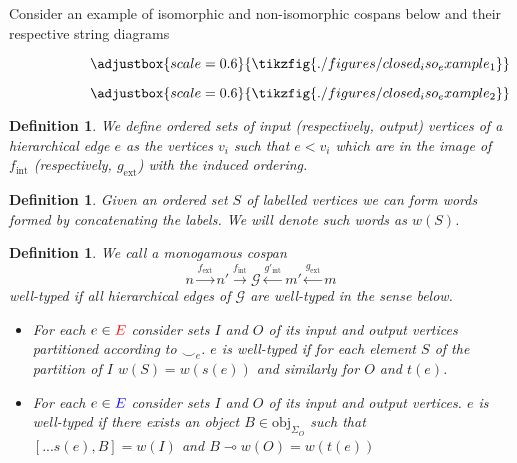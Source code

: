 \documentclass[peerreviewcls]{IEEEtran}
\newtheorem{definition}[theorem]{Definition}
\newcommand{\consistency}{{\smile}}
\begin{document}
Consider an example of isomorphic and non-isomorphic cospans below and their respective string diagrams

\begin{figure}
  \begin{subfigure}[c]{0.4\linewidth}
    \[
    \adjustbox{scale=0.6}{
    \tikzfig{./figures/closed_iso_example_1}
    }
    \]
  \end{subfigure}
  \hfill
  \begin{subfigure}[c]{0.4\linewidth}
    \[
    \adjustbox{scale=0.6}{
    \tikzfig{./figures/closed_iso_example_2}
    }
    \]
  \end{subfigure}
\end{figure}

\begin{definition}

We define ordered sets of \textit{input} (respectively, \textit{output}) vertices of a hierarchical edge $e$ as the vertices $v_{i}$ such that $e < v_{i}$ which are in the image of $f_{\text{int}}$ (respectively, $g_{\text{ext}}$) with the induced ordering.
\end{definition}

\begin{definition}

Given an ordered set $S$ of labelled vertices we can form words formed by concatenating the labels.
We will denote such words as $w(S)$.
\end{definition}

\begin{definition}
We call a monogamous cospan
\[
  n \xrightarrow{f_{\text{ext}}} n' \xrightarrow{f_{\text{int}}} \mathcal{G} \xleftarrow{g'_{\text{int}}} m' \xleftarrow{g_{\text{ext}}} m
\]
\textit{well-typed} if all hierarchical edges of $\mathcal{G}$ are well-typed in the sense below.
\begin{itemize}
  \item For each $e \in \textcolor{red}{E}$ consider sets $I$ and $O$ of its input and output vertices partitioned according to $\consistency_{e}$.
        $e$ is well-typed if for each element $S$ of the partition of $I$ $w(S) = w(s(e))$ and similarly for $O$ and $t(e)$.
  \item For each $e \in \textcolor{blue}{E}$ consider sets $I$ and $O$ of its input and output vertices.
        $e$ is well-typed if there exists an object $B \in \text{obj}_{\Sigma_{O}}$ such that $[...s(e), B] = w(I)$ and $B \multimap w(O) = w(t(e))$
\end{itemize}
\end{definition}




\end{document}

